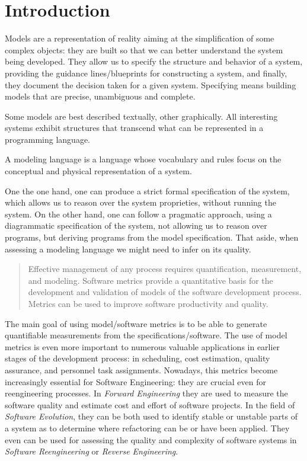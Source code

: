 \section{Introduction}

Models are a representation of reality aiming at the simplification of some complex objects: they are built so that we can better understand the system being developed.
They allow us to specify the structure and behavior of a system, providing the guidance lines/blueprints for constructing a system, and finally, they document the decision taken for a given system.
Specifying means building models that are precise, unambiguous and complete. 

Some models are best described textually, other graphically. All interesting systems exhibit structures that transcend what can be represented in a programming language.

A modeling language is a language whose vocabulary and rules focus on the conceptual and physical representation of a system.%


\par One the one hand, one can produce a strict formal specification of the system, which allows us to reason over the system proprieties, without running the system.
On the other hand, one can follow a pragmatic approach, using a diagrammatic specification of the system, not allowing us to reason over programs,
but deriving programs from the model specification. That aside, when assessing a modeling language we might need to infer on its quality.

\begin{quotation}
Effective management of any process requires quantification, measurement, and modeling.
Software metrics provide a quantitative basis for the development and validation of models of the software development process.
Metrics can be used to improve software productivity and quality\cite{g1:Millis:1998}.
\end{quotation}

The main goal of using model/software metrics is to be able to generate quantifiable measurements from the specifications/software. The use of model metrics is even more
important to numerous valuable applications in earlier stages of the development process: in scheduling, cost estimation, quality assurance, and personnel task assignments.
Nowadays, this metrics become increasingly essential for Software Engineering: they are crucial even for reengineering processes.
In \emph{Forward Engineering} they are used to measure the software quality and estimate cost and effort of software projects\cite{Fenton}.
In the field of \emph{Software Evolution}, they can be both used to identify stable or unstable parts of a system as to determine where refactoring can be or have been applied\cite{Serge}.
They even can be used for assessing the quality and complexity of software systems in \emph{Software Reengineering} or \emph{Reverse Engineering}\cite{43044}.

